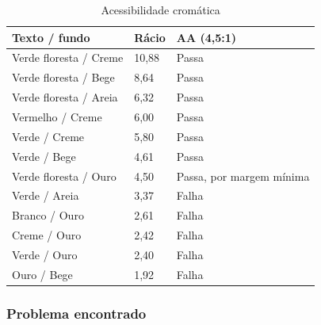 \begin{table}[H]
    \centering
    \renewcommand{\arraystretch}{1.3}
    \begin{tabularx}{\textwidth}{@{}l X X@{}}
        \toprule
        \textbf{Texto / fundo} & \textbf{Rácio} & \textbf{AA (4,5:1)} \\
        \midrule

        Verde floresta / Creme &
        10,88 &
        Passa \\
        \midrule

        Verde floresta / Bege &
        8,64 &
        Passa \\
        \midrule

        Verde floresta / Areia &
        6,32 &
        Passa \\
        \midrule

        Vermelho / Creme &
        6,00 &
        Passa \\
        \midrule

        Verde / Creme &
        5,80 &
        Passa \\
        \midrule

        Verde / Bege &
        4,61 &
        Passa \\
        \midrule

        Verde floresta / Ouro &
        4,50 &
        Passa, por margem mínima \\
        \midrule

        Verde / Areia &
        3,37 &
        Falha \\
        \midrule

        Branco / Ouro &
        2,61 &
        Falha \\
        \midrule

        Creme / Ouro &
        2,42 &
        Falha \\
        \midrule

        Verde / Ouro &
        2,40 &
        Falha \\
        \midrule

        Ouro / Bege &
        1,92 &
        Falha \\

        \bottomrule
    \end{tabularx}
    \caption{Acessibilidade cromática}
    \label{tab:acessibilidade-cromatica}
\end{table}

\subsubsection{Problema encontrado}

